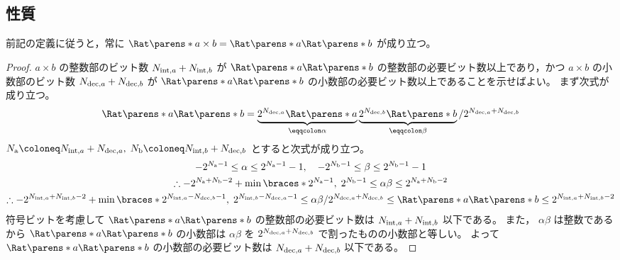         \subsection{性質}
            \newcommand{\Na}{{N_\mathrm{a}}}
            \newcommand{\Nb}{{N_\mathrm{b}}}
            前記の定義に従うと，常に $\Rat\parens*{a\times b} = \Rat\parens*{a}\Rat\parens*{b}$ が成り立つ。
            \begin{proof}
                $a\times b$ の整数部のビット数 ${N_{\mathrm{int},a}}+{N_{\mathrm{int},b}}$ が $\Rat\parens*{a}\Rat\parens*{b}$ の整数部の必要ビット数以上であり，かつ $a\times b$ の小数部のビット数 ${N_{\mathrm{dec},a}}+{N_{\mathrm{dec},b}}$ が $\Rat\parens*{a}\Rat\parens*{b}$ の小数部の必要ビット数以上であることを示せばよい。
                まず次式が成り立つ。
                \[ \Rat\parens*{a}\Rat\parens*{b} = \underbrace{2^\Nda\Rat\parens*{a}}_{\eqqcolon\alpha}\underbrace{2^\Ndb\Rat\parens*{b}}_{\eqqcolon\beta}/2^{\Nda+\Ndb} \]
                $\Na \coloneq \Nia + \Nda,\; \Nb \coloneq \Nib + \Ndb$ とすると次式が成り立つ。
                \begin{gather*}
                    -2^{\Na-1} \leq \alpha \leq 2^{\Na-1}-1,\quad -2^{\Nb-1} \leq \beta \leq 2^{\Nb-1}-1 \\
                    \therefore -2^{\Na+\Nb-2} + \min \braces*{2^{\Na-1},\; 2^{\Nb-1}} \leq \alpha\beta \leq 2^{\Na+\Nb-2} \\
                    \therefore -2^{\Nia+\Nib-2} + \min \braces*{2^{\Nia-\Ndb-1},\; 2^{\Nib-\Nda-1}} \leq \alpha\beta/2^{\Nda+\Ndb} \leq \Rat\parens*{a}\Rat\parens*{b} \leq 2^{\Nia+\Nib-2}
                \end{gather*}
                符号ビットを考慮して $\Rat\parens*{a}\Rat\parens*{b}$ の整数部の必要ビット数は ${N_{\mathrm{int},a}}+{N_{\mathrm{int},b}}$ 以下である。
                また， $\alpha\beta$ は整数であるから $\Rat\parens*{a}\Rat\parens*{b}$ の小数部は $\alpha\beta$ を $2^{{N_{\mathrm{dec},a}}+{N_{\mathrm{dec},b}}}$ で割ったものの小数部と等しい。
                よって $\Rat\parens*{a}\Rat\parens*{b}$ の小数部の必要ビット数は ${N_{\mathrm{dec},a}}+{N_{\mathrm{dec},b}}$ 以下である。
            \end{proof}
